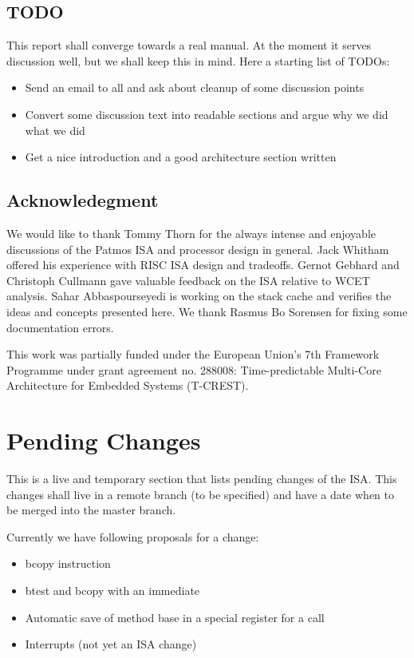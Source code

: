 \documentclass{IEEEtran}
\begin{document}
\subsection{TODO}

This report shall converge towards a real manual. At the moment it serves
discussion well, but we shall keep this in mind. Here a starting list of TODOs:

\begin{itemize}
\item Send an email to all and ask about cleanup of some discussion points
\item Convert some discussion text into readable sections and argue why we
did what we did
\item Get a nice introduction and a good architecture section written
\end{itemize}

\subsection*{Acknowledegment}

We would like to thank Tommy Thorn for the always intense and enjoyable
discussions of the Patmos ISA and processor design in general.
Jack Whitham offered his experience with RISC
ISA design and tradeoffs. 
Gernot Gebhard and Christoph Cullmann gave valuable feedback on the ISA
relative to WCET analysis.
Sahar Abbaspourseyedi is working on the stack
cache and verifies the ideas and concepts presented here. We thank
Rasmus Bo Sorensen for fixing some documentation errors.

This work was partially funded under the
European Union's 7th Framework Programme
under grant agreement no. 288008:
Time-predictable Multi-Core Architecture for Embedded
Systems (T-CREST).

\section{Pending Changes}

This is a live and temporary section that lists pending changes of the ISA.
This changes shall live in a remote branch (to be specified) and have a
date when to be merged into the master branch.

Currently we have following proposals for a change:

\begin{itemize}
\item bcopy instruction
\item btest and bcopy with an immediate
\item Automatic save of method base in a special register for a call
\item Interrupts (not yet an ISA change)
\end{itemize}
\end{document}
